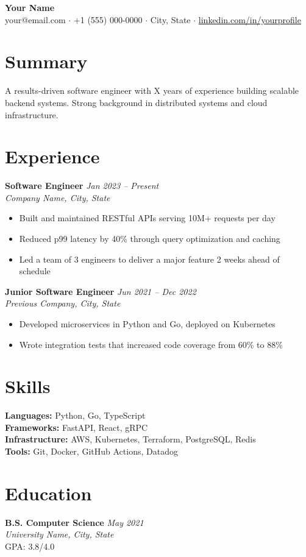 \documentclass[11pt,a4paper]{article}
\begin{document}
\begin{center}
  {\LARGE \textbf{Your Name}} \\[4pt]
  your@email.com $\cdot$ +1 (555) 000-0000 $\cdot$ City, State $\cdot$
  \href{https://linkedin.com/in/yourprofile}{linkedin.com/in/yourprofile}
\end{center}

\section{Summary}
A results-driven software engineer with X years of experience building scalable backend systems.
Strong background in distributed systems and cloud infrastructure.

\section{Experience}

\textbf{Software Engineer} \hfill \textit{Jan 2023 -- Present} \\
\textit{Company Name, City, State}
\begin{itemize}[leftmargin=*, noitemsep, topsep=2pt]
  \item Built and maintained RESTful APIs serving 10M+ requests per day
  \item Reduced p99 latency by 40\% through query optimization and caching
  \item Led a team of 3 engineers to deliver a major feature 2 weeks ahead of schedule
\end{itemize}

\vspace{4pt}
\textbf{Junior Software Engineer} \hfill \textit{Jun 2021 -- Dec 2022} \\
\textit{Previous Company, City, State}
\begin{itemize}[leftmargin=*, noitemsep, topsep=2pt]
  \item Developed microservices in Python and Go, deployed on Kubernetes
  \item Wrote integration tests that increased code coverage from 60\% to 88\%
\end{itemize}

\section{Skills}
\textbf{Languages:} Python, Go, TypeScript \\
\textbf{Frameworks:} FastAPI, React, gRPC \\
\textbf{Infrastructure:} AWS, Kubernetes, Terraform, PostgreSQL, Redis \\
\textbf{Tools:} Git, Docker, GitHub Actions, Datadog

\section{Education}
\textbf{B.S. Computer Science} \hfill \textit{May 2021} \\
\textit{University Name, City, State} \\
GPA: 3.8/4.0
\end{document}
